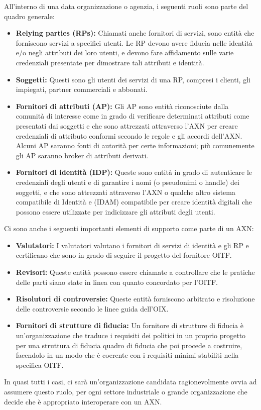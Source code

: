 \singlespacing
All'interno di una data organizzazione o agenzia, i seguenti ruoli sono parte del quadro generale:
\begin{itemize}
    \item \textbf{Relying parties (RPs):} Chiamati anche fornitori di servizi, sono entità che forniscono servizi a specifici utenti. Le RP devono avere fiducia nelle identità e/o negli attributi dei loro utenti, e devono fare affidamento sulle varie credenziali presentate per dimostrare tali attributi e identità.

    \item \textbf{Soggetti:} Questi sono gli utenti dei servizi di una RP, compresi i clienti, gli impiegati, partner commerciali e abbonati.

    \item \textbf{Fornitori di attributi (AP):} Gli AP sono entità riconosciute dalla comunità di interesse come in grado di verificare determinati attributi come presentati dai soggetti e che sono attrezzati attraverso l'AXN per creare credenziali di attributo conformi secondo le regole e gli accordi dell'AXN. Alcuni AP saranno fonti di autorità per certe informazioni; più comunemente gli AP saranno broker di attributi derivati.

    \item \textbf{Fornitori di identità (IDP):} Queste sono entità in grado di autenticare le credenziali degli utenti e di garantire i nomi (o pseudonimi o handle) dei soggetti, e che sono attrezzati attraverso l'AXN o qualche altro sistema compatibile di Identità e (IDAM) compatibile per creare identità digitali che possono essere utilizzate per indicizzare gli attributi degli utenti.
\end{itemize}
Ci sono anche i seguenti importanti elementi di supporto come parte di un AXN:
\begin{itemize}
    \item \textbf{Valutatori:} I valutatori valutano i fornitori di servizi di identità e gli RP e certificano che sono in grado di seguire il progetto del fornitore OITF.
    
    \item \textbf{Revisori:} Queste entità possono essere chiamate a controllare che le pratiche delle parti siano state in linea con quanto concordato per l'OITF.
    
    \item \textbf{Risolutori di controversie:} Queste entità forniscono arbitrato e risoluzione delle controversie secondo le linee guida dell'OIX.
    
    \item \textbf{Fornitori di strutture di fiducia:} Un fornitore di strutture di fiducia è un'organizzazione che traduce i requisiti dei politici in un proprio progetto per una struttura di fiducia quadro di fiducia che poi procede a costruire, facendolo in un modo che è coerente con i requisiti minimi stabiliti nella specifica OITF.
\end{itemize}
In quasi tutti i casi, ci sarà un'organizzazione candidata ragionevolmente ovvia ad assumere questo ruolo, per ogni settore industriale o grande organizzazione che decide che è appropriato interoperare con un AXN.

